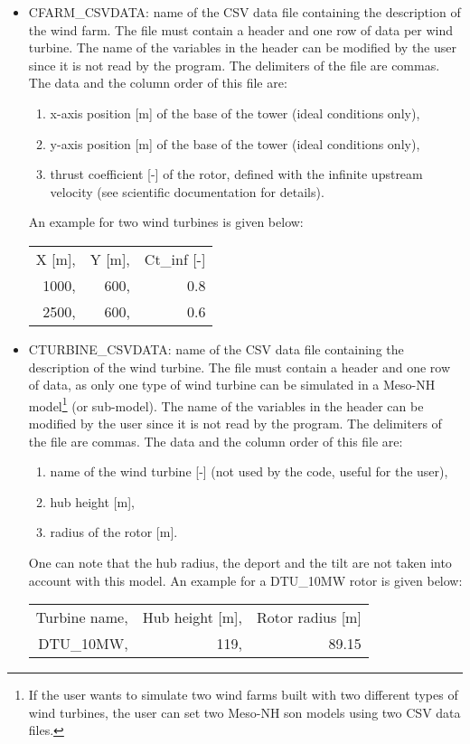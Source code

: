 \begin{itemize}

\item CFARM\_CSVDATA: name of the CSV data file containing the description of the wind farm. The file must contain a header and one row of data per wind turbine. The name of the variables in the header can be modified by the user since it is not read by the program. The delimiters of the file are commas. The data and the column order of this file are: 
\begin{enumerate}
\item x-axis position [m] of the base of the tower (ideal conditions only),
\item y-axis position [m] of the base of the tower (ideal conditions only),
\item thrust coefficient [-] of the rotor, defined with the infinite upstream velocity (see scientific documentation for details).
\end{enumerate}
An example for two wind turbines is given below:
\begin{center}
\begin{tabular} {|rrr|}
\hline
X [m],& Y [m],& Ct\_inf [-] \\
1000,&  600,& 0.8 \\
2500,&  600,& 0.6 \\
\hline
\end{tabular}
\end{center}

\item CTURBINE\_CSVDATA: name of the CSV data file containing the description of the wind turbine. The file must contain a header and one row of data, as only one type of wind turbine can be simulated in a Meso-NH model\footnote{If the user wants to simulate two wind farms built with two different types of wind turbines, the user can set two Meso-NH son models using two CSV data files.} (or sub-model). The name of the variables in the header can be modified by the user since it is not read by the program. The delimiters of the file are commas. The data and the column order of this file are: 
\begin{enumerate}
\item name of the wind turbine [-] (not used by the code, useful for the user),
\item hub height [m],
\item radius of the rotor [m].
\end{enumerate}
One can note that the hub radius, the deport and the tilt are not taken into account with this model. An example for a DTU\_10MW rotor is given below:
\begin{center}
\begin{tabular} {|rrr|}
\hline
Turbine name,& Hub height [m],& Rotor radius [m] \\
DTU\_10MW,&  119,& 89.15 \\
\hline
\end{tabular}
\end{center}



\end{itemize}

